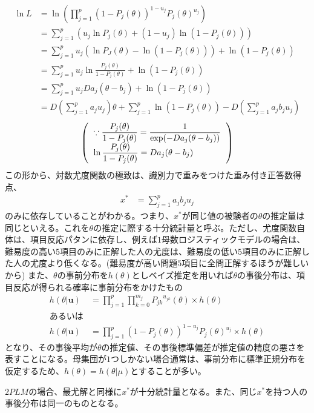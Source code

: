 \documentclass[12pt]{jarticle}
\begin{document}
\begin{align*}
  \label{05}
  \displaystyle \ln L &= \ln \left(\prod_{j = 1}^{p} (1 - P_j(\theta))^{1 - u_j}P_j(\theta)^{u_j}\right)\\
  &= \sum_{j = 1}^{p} \left(u_j\ln P_j(\theta) + (1 - u_j)\ln(1 - P_j(\theta)) \right) \\
  &= \sum_{j = 1}^{p}  u_j(\ln P_J(\theta)- \ln (1 - P_j(\theta))) + \ln (1 - P_j(\theta)) \\
  &= \sum_{j = 1}^{p} u_j \ln \frac{P_j(\theta)}{1 - P_j(\theta)} + \ln(1-P_j(\theta)) \\
  &= \sum_{j = 1}^{p} u_j  Da_j(\theta - b_j) + \ln(1-P_j(\theta)) \\
  &= D(\sum_{j = 1}^{p}a_ju_j)\theta  + \sum_{j = 1}^{p} \ln (1 - P_j(\theta)) - D(\sum_{j = 1}^{p} a_jb_ju_j) \tag{7}
\end{align*}
\[
  \left(
  \begin{tabular}{l}
    $\displaystyle\because \frac{P_j(\theta)}{1 - P_j(\theta)} = \frac{1}{\exp(-D a_j (\theta - b_j))}$  \\  $\displaystyle\ln \frac{P_j(\theta)}{1 - P_j(\theta)} = Da_j(\theta - b_j)$
  \end{tabular}
  \right)
\]
この形から、対数尤度関数の極致は、識別力で重みをつけた重み付き正答数得点、
\begin{align}
  \label{06}
  \displaystyle x^{\ast} &= \sum_{j = 1}^{p} a_j b_j u_j \tag{8}
\end{align}
のみに依存していることがわかる。つまり、$x^{\ast}$が同じ値の被験者の$\theta$の推定量は同じといえる。これを$\theta$の推定に際する十分統計量と呼ぶ。ただし、尤度関数自体は、項目反応パタンに依存し、例えば$1$母数ロジスティックモデルの場合は、難易度の高い$5$項目のみに正解した人の尤度は、難易度の低い$5$項目のみに正解した人の尤度より低くなる。(難易度が高い問題$5$項目に全問正解するほうが難しいから)
また、$\theta$の事前分布を$h(\theta)$としベイズ推定を用いれば$\theta$の事後分布は、項目反応が得られる確率に事前分布をかけたもの
\begin{align*}
  \label{07}
  \displaystyle h(\theta|\boldsymbol{u})&=\prod_{j = 1}^{p} \prod_{k = 0}^{m_j} {P_{jk}}^{u_{jk}}(\theta)\times h(\theta)\\
  あるいは\\
  h(\theta|\boldsymbol{u}) &= \prod_{j = 1}^{p} (1 - P_j(\theta))^{1 - u_j}P_j(\theta)^{u_j} \times h(\theta) \tag{9}
\end{align*}
となり、その事後平均が$\theta$の推定値、その事後標準偏差が推定値の精度の悪さを表すことになる。母集団が$1$つしかない場合通常は、事前分布に標準正規分布を仮定するため、$h(\theta) = h(\theta|\mu)$とすることが多い。

$2PLM$の場合、最尤解と同様に$x^{\ast}$が十分統計量となる。また、同じ$x^{\ast}$を持つ人の事後分布は同一のものとなる。
\end{document}
